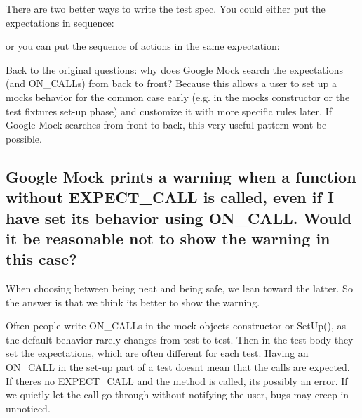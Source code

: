 There are two better ways to write the test spec. You could either put the expectations in sequence\+:


\begin{DoxyCode}{0}
\DoxyCodeLine{\{}
\DoxyCodeLine{\}}
\end{DoxyCode}


or you can put the sequence of actions in the same expectation\+:


\begin{DoxyCode}{0}
\end{DoxyCode}


Back to the original questions\+: why does Google Mock search the expectations (and {\ttfamily O\+N\+\_\+\+C\+A\+LL}s) from back to front? Because this allows a user to set up a mock\textquotesingle{}s behavior for the common case early (e.\+g. in the mock\textquotesingle{}s constructor or the test fixture\textquotesingle{}s set-\/up phase) and customize it with more specific rules later. If Google Mock searches from front to back, this very useful pattern won\textquotesingle{}t be possible.

\subsection*{Google Mock prints a warning when a function without E\+X\+P\+E\+C\+T\+\_\+\+C\+A\+LL is called, even if I have set its behavior using O\+N\+\_\+\+C\+A\+LL. Would it be reasonable not to show the warning in this case?}

When choosing between being neat and being safe, we lean toward the latter. So the answer is that we think it\textquotesingle{}s better to show the warning.

Often people write {\ttfamily O\+N\+\_\+\+C\+A\+LL}s in the mock object\textquotesingle{}s constructor or {\ttfamily Set\+Up()}, as the default behavior rarely changes from test to test. Then in the test body they set the expectations, which are often different for each test. Having an {\ttfamily O\+N\+\_\+\+C\+A\+LL} in the set-\/up part of a test doesn\textquotesingle{}t mean that the calls are expected. If there\textquotesingle{}s no {\ttfamily E\+X\+P\+E\+C\+T\+\_\+\+C\+A\+LL} and the method is called, it\textquotesingle{}s possibly an error. If we quietly let the call go through without notifying the user, bugs may creep in unnoticed.

